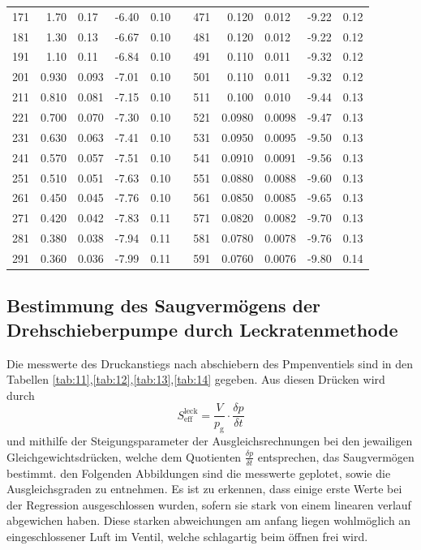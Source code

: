 \begin{table}[H]
\begin{tabular}{|r|r@{\,$\pm$\,}l|r@{\,$\pm$\,}l|p{0.5cm}|r|r@{\,$\pm$\,}l|r@{\,$\pm$\,}l|}
171 & 1.70   & 0.17  & -6.40  & 0.10  & & 471 & 0.120  & 0.012 & -9.22  & 0.12  \\
181 & 1.30   & 0.13  & -6.67  & 0.10  & & 481 & 0.120  & 0.012 & -9.22  & 0.12  \\
191 & 1.10   & 0.11  & -6.84  & 0.10  & & 491 & 0.110  & 0.011 & -9.32  & 0.12  \\
201 & 0.930  & 0.093 & -7.01  & 0.10  & & 501 & 0.110  & 0.011 & -9.32  & 0.12  \\
211 & 0.810  & 0.081 & -7.15  & 0.10  & & 511 & 0.100  & 0.010 & -9.44  & 0.13  \\
221 & 0.700  & 0.070 & -7.30  & 0.10  & & 521 & 0.0980 & 0.0098 & -9.47 & 0.13  \\
231 & 0.630  & 0.063 & -7.41  & 0.10  & & 531 & 0.0950 & 0.0095 & -9.50 & 0.13  \\
241 & 0.570  & 0.057 & -7.51  & 0.10  & & 541 & 0.0910 & 0.0091 & -9.56 & 0.13  \\
251 & 0.510  & 0.051 & -7.63  & 0.10  & & 551 & 0.0880 & 0.0088 & -9.60 & 0.13  \\
261 & 0.450  & 0.045 & -7.76  & 0.10  & & 561 & 0.0850 & 0.0085 & -9.65 & 0.13  \\
271 & 0.420  & 0.042 & -7.83  & 0.11  & & 571 & 0.0820 & 0.0082 & -9.70 & 0.13  \\
281 & 0.380  & 0.038 & -7.94  & 0.11  & & 581 & 0.0780 & 0.0078 & -9.76 & 0.13  \\
291 & 0.360  & 0.036 & -7.99  & 0.11  & & 591 & 0.0760 & 0.0076 & -9.80 & 0.14  \\
\hline
\end{tabular}
\end{table}

\subsection{Bestimmung des Saugvermögens der Drehschieberpumpe durch Leckratenmethode}
Die messwerte des Druckanstiegs nach abschiebern des Pmpenventiels sind in den Tabellen \autoref{tab:11},\autoref{tab:12},\autoref{tab:13},\autoref{tab:14} gegeben. 
Aus diesen Drücken wird durch 
\begin{equation}
  \label{eqn:20}
  S_\text{eff}^\text{leck} = \frac{V}{p_\text{g}} \cdot \frac{\delta p}{\delta t}
\end{equation}
und mithilfe der Steigungsparameter der Ausgleichsrechnungen bei den jewailigen Gleichgewichtsdrücken, welche dem Quotienten $\frac{\delta p}{\delta t}$
entsprechen, das Saugvermögen bestimmt. den Folgenden Abbildungen sind die messwerte geplotet, sowie 
die Ausgleichsgraden zu entnehmen. Es ist zu erkennen, dass einige erste Werte bei der Regression ausgeschlossen wurden, sofern sie stark von einem linearen verlauf abgewichen haben. Diese starken abweichungen am anfang liegen wohlmöglich an eingeschlossener 
Luft im Ventil, welche schlagartig beim öffnen frei wird.

